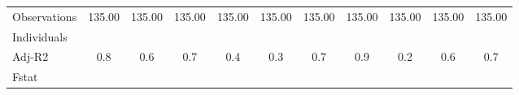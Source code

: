 {\begin{tabular}{l*{10}{c}}
Observations        &135.00   &135.00   &135.00   &135.00   &135.00   &135.00   &135.00   &135.00   &135.00   &135.00   \\
Individuals         &         &         &         &         &         &         &         &         &         &         \\
Adj-R2              &   0.8   &   0.6   &   0.7   &   0.4   &   0.3   &   0.7   &   0.9   &   0.2   &   0.6   &   0.7   \\
Fstat               &         &         &         &         &         &         &         &         &         &         \\
\hline\hline
\end{tabular}
}
